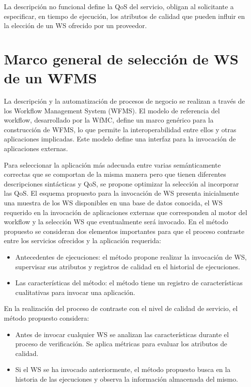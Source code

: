 La descripción no funcional define la QoS del servicio, obligan al solicitante a especificar, en tiempo de ejecución, los atributos de calidad que pueden influir en la elección de un WS ofrecido por un proveedor.

\section{Marco general de selección de WS de un WFMS}
\label{Marco general de selección de WS de un WFMS}

La descripción y la automatización de procesos de negocio se realizan a través de los Workflow Management System (WFMS). El modelo de referencia del workflow, desarrollado por la WfMC, define un marco genérico para la construcción de WFMS, lo que permite la interoperabilidad entre ellos y otras aplicaciones implicadas. Este modelo define una interfaz para la invocación de aplicaciones externas. 

Para seleccionar la aplicación más adecuada entre varias semánticamente correctas que se comportan de la misma manera pero que tienen diferentes descripciones sintácticas y QoS, se propone optimizar la selección al incorporar las QoS. El esquema propuesto para la invocación de WS presenta inicialmente una muestra de los WS disponibles en una base de datos conocida, el WS requerido en la invocación de aplicaciones externas que corresponden al motor del workflow y la selección WS que eventualmente será invocado. En el método propuesto se consideran dos elementos importantes para que el proceso contraste entre los servicios ofrecidos y la aplicación requerida:

\begin{itemize}
	\item Antecedentes de ejecuciones: el método propone realizar la invocación de WS, supervisar sus atributos y registros de calidad en el historial de ejecuciones.
	\item Las características del método: el método tiene un registro de características cualitativas para invocar una aplicación.
\end{itemize}

En la realización del proceso de contraste con el nivel de calidad de servicio, el método propuesto considera:

\begin{itemize}
	\item Antes de invocar cualquier WS se analizan las características durante el proceso de verificación. Se aplica métricas para evaluar los atributos de calidad.
	\item Si el WS se ha invocado anteriormente, el método propuesto busca en la historia de las ejecuciones y observa la información almacenada del mismo.
\end{itemize}

